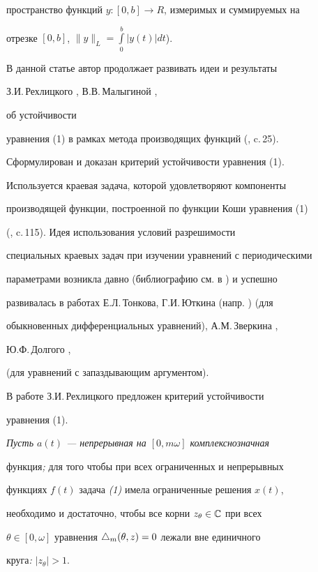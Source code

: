 пространство функций $y:[0,b]\to R$, измеримых и суммируемых на


отрезке $[0,b]$, $\|y\|_{L}=\int\limits_0^b|y(t)|dt$).





В данной статье автор продолжает развивать идеи и результаты


З.И.\,Рехлицкого \cite{Re}, В.В.\,Ма\-лыгиной \cite{Ma1}, \cite{Ma2}


об устойчивости


уравнения (1) в рамках метода производящих функций (\cite{Pin}, c.\,25).


Сформулирован и доказан критерий устойчивости уравнения (1).


Используется краевая задача, которой удовлетворяют компоненты


производящей функции, построенной по функции Коши уравнения (1)


(\cite{Azb}, c.\,115). Идея использования условий разрешимости


специальных краевых задач при изучении уравнений с периодическими


параметрами возникла давно (библиографию см. в \cite{Pin}) и успешно


развивалась в работах Е.Л.\,Тонкова, Г.И.\,Юткина (напр. \cite{Ton}) (для


обыкновенных дифференциальных уравнений), А.М.\,Зверкина \cite{Zve},


Ю.Ф.\,Долгого \cite{Do1}, \cite{Do2}


(для уравнений с запаздывающим аргументом).





В работе З.И.\,Рехлицкого \cite{Re} предложен критерий устойчивости


уравнения (1).





{\it Пусть $a(t)$ --- непрерывная на $[0,m\omega]$ комплекснозначная


функция{\em ;} для того чтобы при всех ограниченных и непрерывных


функциях $f(t)$ задача {\em (1)} имела ограниченные решения $x(t)$,


необходимо и достаточно, чтобы все корни $z_\theta\in \Bbb{C}$ при всех


$\theta\in[0,\omega]$ уравнения $\triangle_m(\theta,z)=0$ лежали вне единичного


круга{\em :} $|z_\theta|>1$.}





